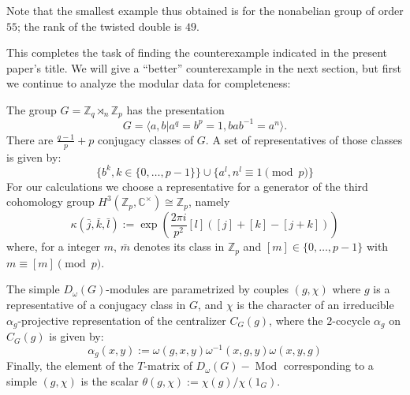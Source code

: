\documentclass[12pt]{amsart}
\theoremstyle{remark}
\theoremstyle{definition}
\numberwithin{equation}{section}
\newcommand\Mod{\operatorname{Mod}}
\begin{document}
Note that the smallest example thus obtained is for the nonabelian group of order $55$; the rank of the twisted double is $49$. 

This completes the task of finding the counterexample indicated in the present paper's title. We will give a ``better'' counterexample in the next section, but first we continue to analyze the modular data for completeness:



The group $G=\mathbb{Z}_q \rtimes_n \mathbb{Z}_p$ 
has the presentation
$$G= \langle a,b | a^q = b^p =1 , bab^{-1} = a^n \rangle.$$
There are $\frac{q-1}{p}+p$ conjugacy classes of $G$. A set of representatives of those classes is given by:
$$\lbrace b^k , k \in \{0, \dots , p-1\} \rbrace \cup \lbrace a^l , n^l \equiv 1 \pmod p \rbrace$$
For our calculations we choose a representative for a generator of the third cohomology group
$H^3(\mathbb{Z}_p,\mathbb{C^\times}) \cong \mathbb{Z}_p$, namely \cite[(E.14)]{MooSei:CQCFT}
\begin{equation}\label{eq}
\kappa(\bar{j},\bar{k},\bar{l}):=\exp \left( \frac{2 \pi i}{p^2}[l]([j]+[k]-[j+k])\right)
\end{equation}
where, for a integer $m$, $\bar{m}$ denotes its class in $\mathbb{Z}_p$ and $[m] \in \lbrace 0 , \dots , p-1 \rbrace$ with $m \equiv [m] \pmod p$.

The simple
$D_ \omega(G)$-modules are parametrized by couples $(g, \chi)$ where $g$ is a representative of a conjugacy class in $G$, and $\chi$ is the character of an irreducible $\alpha_g$-projective representation of the centralizer $C_G(g)$, where the $2$-cocycle $\alpha_g$ on $C_G(g)$ is given by: 
$$\alpha_g(x,y):=\omega(g,x,y) \omega^{-1}(x,g,y) \omega(x,y,g)$$
Finally, the element of the $T$-matrix of $D_ \omega(G)-\Mod$ corresponding to a simple $(g,\chi)$ is the scalar $\theta(g,\chi):=\chi(g) / \chi(1_G)$.
\end{document}
